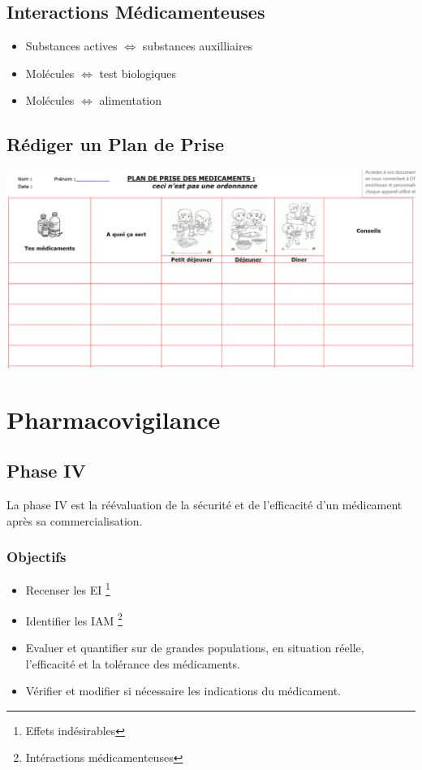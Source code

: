 \documentclass[11pt]{article}
\begin{document}
\subsection{Interactions Médicamenteuses}
\label{sec:org751ae54}
\begin{itemize}
\item Substances actives \(\Leftrightarrow\) substances auxilliaires
\item Molécules \(\Leftrightarrow\) test biologiques
\item Molécules \(\Leftrightarrow\) alimentation
\end{itemize}
\subsection{Rédiger un Plan de Prise}
\label{sec:org61742b3}
\begin{center}
\includegraphics[width=.9\linewidth]{./plandeprise.png}
\end{center}
\section{Pharmacovigilance}
\label{sec:org81567f5}
\setlength{\parindent}{0pt}
\subsection{Phase IV}
\label{sec:orgd0f9eb3}
La phase IV est la réévaluation de la sécurité et de l'efficacité d'un médicament après sa commercialisation.
\subsubsection{Objectifs}
\label{sec:orge14ba58}
\begin{itemize}
\item Recenser les EI \footnote{Effets indésirables}
\item Identifier les IAM \footnote{Intéractions médicamenteuses}
\item Evaluer et quantifier sur de grandes populations, en situation réelle, l'efficacité et la tolérance des médicaments.
\item Vérifier et modifier si nécessaire les indications du médicament.
\end{itemize}
\end{document}
